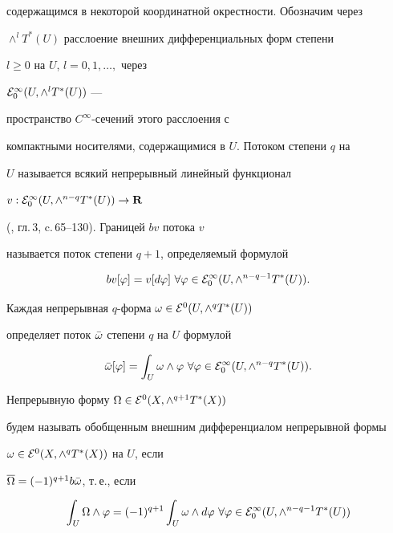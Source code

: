 содержащимся в некоторой координатной окрестности. Обозначим через


$\wedge^lT^*(U)$ расслоение внешних дифференциальных форм степени


$l\ge 0$ на $U$, $l= 0,1,\dotsc,$ через


${\cal E}^{\infty}_0(U,\wedge^lT^*(U))$ ---


пространство $C^{\infty}$-сечений этого расслоения с


компактными носителями, содержащимися в $U$. Потоком степени $q$ на


$U$ называется всякий непрерывный линейный функционал


$v:{\cal E}^{\infty}_0(U,\wedge^{n-q}T^*(U))\to {\bold R}$


(\cite{DeRh}, гл.\,3, c.\,65--130). Границей $bv$ потока $v$


называется поток степени $q+1$, определяемый формулой


$$


bv[\varphi]=v[d\varphi] \ \forall \varphi\in


{\cal E}^{\infty}_0(U,\wedge^{n-q-1}T^*(U)).


$$


Каждая непрерывная $q$-форма $\omega\in {\cal E}^0(U,\wedge^qT^*(U))$


определяет поток $\Bar\omega$ степени $q$ на $U$ формулой


$$


\Bar\omega[\varphi]=\int_{U}\omega\wedge\varphi \


\forall \varphi\in{\cal E}^{\infty}_0(U,\wedge^{n-q}T^*(U)).


$$





Непрерывную форму $\Omega\in {\cal E}^0(X,\wedge^{q+1}T^*(X))$


будем называть обобщенным внешним дифференциалом непрерывной формы


$\omega\in {\cal E}^0(X,\wedge^qT^*(X))$ на $U$, если


$\overline\Omega= (-1)^{q+1}b\Bar\omega$, т.\,е., если


\begin{equation}


\int_{U}\Omega\wedge\varphi=(-1)^{q+1}\int_{U}\omega\wedge d\varphi \


\forall \varphi\in{\cal E}^{\infty}_0(U,\wedge^{n-q-1}T^*(U))


\end{equation}


